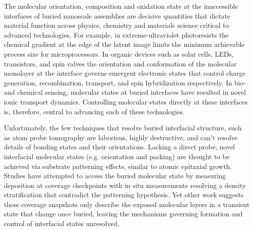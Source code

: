The molecular orientation\autocite{tumblestonInfluenceMolecularOrientation2014,yokoyamaMolecularOrientationSmallmolecule2011}, composition\autocite{collinsAbsoluteMeasurementDomain2013} and oxidation state\autocite{cabanaMechanismsDegradationStrategies2018a,wangInsightsDynamicSurface2024} at the inaccessible interfaces of buried nanoscale assemblies are decisive quantities that dictate material function across physics, chemistry and materials science critical to advanced technologies. For example, in extreme-ultraviolet photoresists the chemical gradient at the edge of the latent image limits the minimum achievable process size for microprocessors.\autocite{bisschopStochasticEffectsEUV2017,andrleNanostructureCharacterizationRSoXS2026} In organic devices such as solar cells, LEDs, transistors, and spin valves the orientation and conformation of the molecular monolayer at the interface governs emergent electronic states that control charge generation, recombination, transport, and spin hybridization respectively.\autocite{tumblestonInfluenceMolecularOrientation2014,yokoyamaMolecularOrientationSmallmolecule2011,peiSemiconductorDielectricInterface2020,jiangToughenedSelfassembledMonolayers2025,droghettiDynamicSpinFiltering2016} In bio- and chemical sensing, molecular states at buried interfaces have resulted in novel ionic transport dynamics.\autocite{khanLocalChemicalEnhancement2025,triggSelfassembledHighlyOrdered2018,dongSuperProtonConductive2010} Controlling molecular states directly at these interfaces is, therefore, central to advancing each of these technologies.

Unfortunately, the few techniques that resolve buried interfacial structure, such as atom probe tomography are laborious, highly destructive, and can't resolve details of bonding states and their orientations.\autocite{cojocaru-miredinAtomProbeTomography2024} Lacking a direct probe, novel interfacial molecular states (e.g. orientation and packing) are thought to be achieved via substrate patterning effects,\autocite{katoMorphologicalOpticalProperties2020a,ngongangndjawaImpactMolecularOrientation2015,schunemannZincPhthalocyanineInfluence2011} similar to atomic epitaxial growth. Studies have attempted to access the buried molecular state by measuring deposition at coverage checkpoints\autocite{derrienInterfacialRearrangementsStrain2022,yamamotoVariationZincPhthalocyanine2022,deoteyzaStructuralRearrangementsInitial2006} with in situ measurements resolving a density stratification that contradict the patterning hypothesis.\autocite{derrienInterfacialRearrangementsStrain2022} Yet other work suggests these coverage snapshots only describe the exposed molecular layers in a transient state that change once buried,\autocite{yamamotoVariationZincPhthalocyanine2022,deoteyzaStructuralRearrangementsInitial2006} leaving the mechanisms governing formation and control of interfacial states unresolved.


